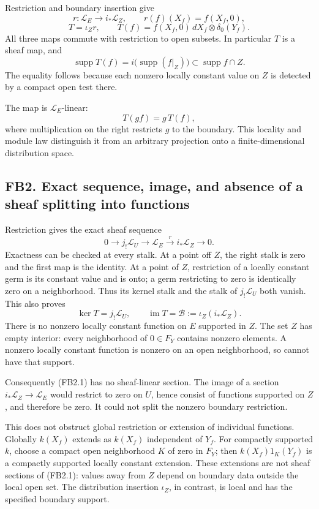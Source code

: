 Restriction and boundary insertion give \[
r:\mathscr L_E\longrightarrow i_*\mathscr L_Z,\qquad
r(f)(X_f)=f(X_f,0),
\] \[
\boxed{T=\iota_Zr,\qquad
T(f)=f(X_f,0)\,dX_f\otimes\delta_0(Y_f).}
\tag{FB1.3}
\] All three maps commute with restriction to open subsets. In
particular \(T\) is a sheaf map, and \[
\operatorname{supp}T(f)
=i\bigl(\operatorname{supp}(f|_Z)\bigr)
\subset\operatorname{supp}f\cap Z.
\tag{FB1.4}
\] The equality follows because each nonzero locally constant value on
\(Z\) is detected by a compact open test there.

The map is \(\mathscr L_E\)-linear: \[
T(gf)=g\,T(f),
\tag{FB1.5}
\] where multiplication on the right restricts \(g\) to the boundary.
This locality and module law distinguish it from an arbitrary projection
onto a finite-dimensional distribution space.

\subsection{FB2. Exact sequence, image, and absence of a sheaf splitting
into
functions}\label{fb2.-exact-sequence-image-and-absence-of-a-sheaf-splitting-into-functions}

Restriction gives the exact sheaf sequence \[
0\longrightarrow j_!\mathscr L_U
\longrightarrow\mathscr L_E
\xrightarrow{\,r\,}i_*\mathscr L_Z
\longrightarrow0.
\tag{FB2.1}
\] Exactness can be checked at every stalk. At a point off \(Z\), the
right stalk is zero and the first map is the identity. At a point of
\(Z\), restriction of a locally constant germ is its constant value and
is onto; a germ restricting to zero is identically zero on a
neighborhood. Thus its kernel stalk and the stalk of \(j_!\mathscr L_U\)
both vanish. This also proves \[
\ker T=j_!\mathscr L_U,\qquad
\operatorname{im}T=\mathscr B:=\iota_Z(i_*\mathscr L_Z).
\tag{FB2.2}
\] There is no nonzero locally constant function on \(E\) supported in
\(Z\). The set \(Z\) has empty interior: every neighborhood of
\(0\in F_Y\) contains nonzero elements. A nonzero locally constant
function is nonzero on an open neighborhood, so cannot have that
support.

Consequently (FB2.1) has no sheaf-linear section. The image of a section
\(i_*\mathscr L_Z\to\mathscr L_E\) would restrict to zero on \(U\),
hence consist of functions supported on \(Z\), and therefore be zero. It
could not split the nonzero boundary restriction.

This does not obstruct global restriction or extension of individual
functions. Globally \(k(X_f)\) extends as \(k(X_f)\) independent of
\(Y_f\). For compactly supported \(k\), choose a compact open
neighborhood \(K\) of zero in \(F_Y\); then \(k(X_f)1_K(Y_f)\) is a
compactly supported locally constant extension. These extensions are not
sheaf sections of (FB2.1): values away from \(Z\) depend on boundary
data outside the local open set. The distribution insertion \(\iota_Z\),
in contrast, is local and has the specified boundary support.


